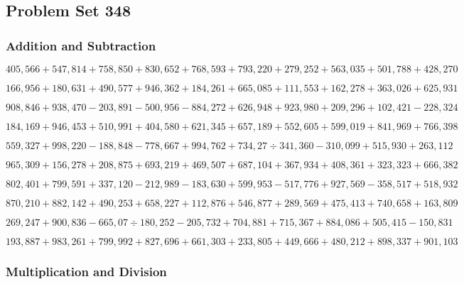 \hypertarget{problem-set-348}{%
\subsection{Problem Set 348}\label{problem-set-348}}

\hypertarget{addition-and-subtraction}{%
\subsubsection{Addition and
Subtraction}\label{addition-and-subtraction}}

\(405,566+547,814+758,850+830,652+768,593+793,220+279,252+563,035+501,788+428,270\)

\(166,956+180,631+490,577+946,362+184,261+665,085+111,553+162,278+363,026+625,931\)

\(908,846+938,470-203,891-500,956-884,272+626,948+923,980+209,296+102,421-228,324\)

\(184,169+946,453+510,991+404,580+621,345+657,189+552,605+599,019+841,969+766,398\)

\(559,327+998,220-188,848-778,667+994,762+734,27÷341,360-310,099+515,930+263,112\)

\(965,309+156,278+208,875+693,219+469,507+687,104+367,934+408,361+323,323+666,382\)

\(802,401+799,591+337,120-212,989-183,630+599,953-517,776+927,569-358,517+518,932\)

\(870,210+882,142+490,253+658,227+112,876+546,877+289,569+475,413+740,658+163,809\)

\(269,247+900,836-665,07÷180,252-205,732+704,881+715,367+884,086+505,415-150,831\)

\(193,887+983,261+799,992+827,696+661,303+233,805+449,666+480,212+898,337+901,103\)

\hypertarget{multiplication-and-division}{%
\subsubsection{Multiplication and
Division}\label{multiplication-and-division}}

